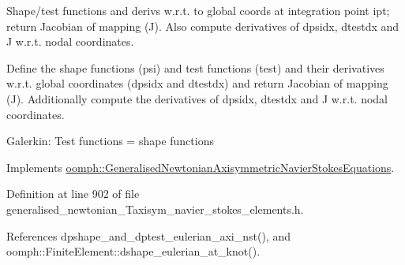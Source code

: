 Shape/test functions and derivs w.\+r.\+t. to global coords at integration point ipt; return Jacobian of mapping (J). Also compute derivatives of dpsidx, dtestdx and J w.\+r.\+t. nodal coordinates. 

Define the shape functions (psi) and test functions (test) and their derivatives w.\+r.\+t. global coordinates (dpsidx and dtestdx) and return Jacobian of mapping (J). Additionally compute the derivatives of dpsidx, dtestdx and J w.\+r.\+t. nodal coordinates.

Galerkin\+: Test functions = shape functions 

Implements \hyperlink{classoomph_1_1GeneralisedNewtonianAxisymmetricNavierStokesEquations_a768856dbac816acd9b207ed6065bcae7}{oomph\+::\+Generalised\+Newtonian\+Axisymmetric\+Navier\+Stokes\+Equations}.



Definition at line 902 of file generalised\+\_\+newtonian\+\_\+\+Taxisym\+\_\+navier\+\_\+stokes\+\_\+elements.\+h.



References dpshape\+\_\+and\+\_\+dptest\+\_\+eulerian\+\_\+axi\+\_\+nst(), and oomph\+::\+Finite\+Element\+::dshape\+\_\+eulerian\+\_\+at\+\_\+knot().

\mbox{\label{classoomph_1_1GeneralisedNewtonianAxisymmetricTTaylorHoodElement_a8df69ffc1f0a57cbac6e11ad35621d67}} 

